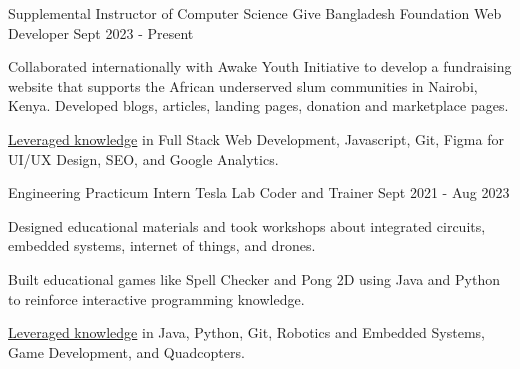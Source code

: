 

\begin{cventries}

\cventryalt
    {Supplemental Instructor of Computer Science} %
    {Give Bangladesh Foundation} %
    {Web Developer} %
    {Sept 2023 - Present} %
    {
      \begin{cvitems}
      \item {Collaborated internationally with Awake Youth Initiative to develop a fundraising website that supports the African underserved slum communities in Nairobi, Kenya. 
      Developed blogs, articles, landing pages, donation and marketplace pages.}
      \item {\underline{Leveraged knowledge} in Full Stack Web Development, Javascript, Git, Figma for UI/UX Design, SEO, and Google Analytics.}
      \end{cvitems}
    }

\cventryalt
    {Engineering Practicum Intern} %
    {Tesla Lab} %
    {Coder and Trainer} %
    {Sept 2021 - Aug 2023} %
    {
      \begin{cvitems}
        \item {Designed educational materials and took workshops about integrated circuits, embedded systems, internet of things, and drones.}
        \item {Built educational games like Spell Checker and Pong 2D using Java and Python to reinforce interactive programming knowledge.}
        \item {\underline{Leveraged knowledge} in Java, Python, Git, Robotics and Embedded Systems, Game Development, and Quadcopters.}
      \end{cvitems}
    }

\end{cventries}
